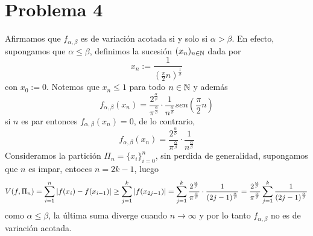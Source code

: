 \documentclass{article}
\begin{document}
\section*{Problema 4}
\noindent Afirmamos que $f_{\alpha,\beta}$ es de variación acotada si y solo si $\alpha>\beta$. 
En efecto, supongamos que $\alpha\leq\beta$, definimos la sucesión $(x_{n})_{n\in\mathbb{N}}$ dada por
\begin{equation*}
    x_{n}:=\frac{1}{(\frac{\pi}{2} n)^{\frac{1}{\beta}}}
\end{equation*}
con $x_{0}:=0$. Notemos que $x_{n}\leq1$ para todo $n\in\mathbb{N}$ y además
\begin{equation*}
    f_{\alpha,\beta}(x_{n})=\frac{2^{\frac{\alpha}{\beta}}}{\pi^{\frac{\alpha}{\beta}}}\cdot
    \frac{1}{n^{\frac{\alpha}{\beta}}}sen\left(\frac{\pi}{2} n\right)
\end{equation*}
si $n$ es par entonces $f_{\alpha,\beta}(x_{n})=0$, de lo contrario,
\begin{equation*}
    f_{\alpha,\beta}(x_{n})=\frac{2^{\frac{\alpha}{\beta}}}{\pi^{\frac{\alpha}{\beta}}}\cdot
    \frac{1}{n^{\frac{\alpha}{\beta}}}
\end{equation*}
Consideramos la partición $\Pi_{n}=\{x_{i}\}_{i=0}^{n}$, sin perdida de generalidad, supongamos que 
$n$ es impar, entoces $n=2k-1$, luego
\begin{equation*}
    V(f,\Pi_{n})=\sum_{i=1}^{n}\left|f(x_{i})-f(x_{i-1}) \right|\geq\sum_{j=1}^{k}\left|f(x_{2j-1}) \right|
    =\sum_{j=1}^{k}\frac{2^{\frac{\alpha}{\beta}}}{\pi^{\frac{\alpha}{\beta}}}\cdot
    \frac{1}{(2j-1)^{\frac{\alpha}{\beta}}}=\frac{2^{\frac{\alpha}{\beta}}}
    {\pi^{\frac{\alpha}{\beta}}}\sum_{j=1}^{k}\frac{1}{(2j-1)^{\frac{\alpha}{\beta}}}
\end{equation*}
como $\alpha\leq\beta$, la última suma diverge cuando $n\to\infty$ y por lo tanto 
$f_{\alpha,\beta}$ no es de variación acotada.
\end{document}

